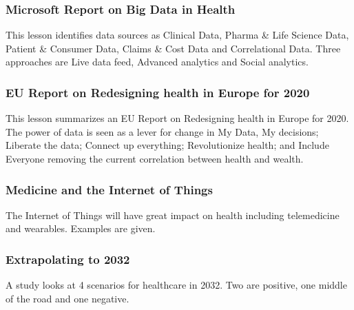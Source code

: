 
\subsubsection{Microsoft Report on Big Data in
Health}\label{microsoft-report-on-big-data-in-health}

This lesson identifies data sources as Clinical Data, Pharma \& Life
Science Data, Patient \& Consumer Data, Claims \& Cost Data and
Correlational Data. Three approaches are Live data feed, Advanced
analytics and Social analytics.



\subsubsection{EU Report on Redesigning health in Europe for
2020}\label{eu-report-on-redesigning-health-in-europe-for-2020}

This lesson summarizes an EU Report on Redesigning health in Europe for
2020. The power of data is seen as a lever for change in My Data, My
decisions; Liberate the data; Connect up everything; Revolutionize
health; and Include Everyone removing the current correlation between
health and wealth.




\subsubsection{Medicine and the Internet of
Things}\label{medicine-and-the-internet-of-things}

The Internet of Things will have great impact on health including
telemedicine and wearables. Examples are given.



\subsubsection{Extrapolating to 2032}\label{extrapolating-to-2032}

A study looks at 4 scenarios for healthcare in 2032. Two are positive,
one middle of the road and one negative.

